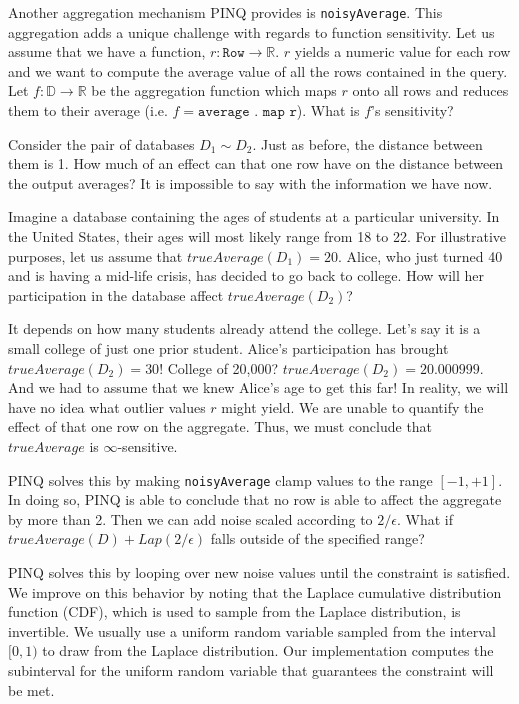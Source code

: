 \documentclass[12pt]{article}
\begin{document}
Another aggregation mechanism PINQ provides is \texttt{noisyAverage}.
This aggregation adds a unique challenge with regards to function sensitivity.
Let us assume that we have a function, $r : \texttt{Row} \rightarrow \mathbb R$.
$r$ yields a numeric value for each row and we want to compute the average value of all the rows contained in the query.
Let $f : \mathbb D \rightarrow \mathbb R$ be the aggregation function which maps $r$ onto all rows and reduces them to their average (i.e. $f = \texttt{average . map r}$).
What is $f$'s sensitivity?

Consider the pair of databases $D_1 \sim D_2$.
Just as before, the distance between them is 1.
How much of an effect can that one row have on the distance between the output averages?
It is impossible to say with the information we have now.

Imagine a database containing the ages of students at a particular university.
In the United States, their ages will most likely range from 18 to 22.
For illustrative purposes, let us assume that $trueAverage(D_1) = 20$.
Alice, who just turned 40 and is having a mid-life crisis, has decided to go back to college.
How will her participation in the database affect $trueAverage(D_2)$?

It depends on how many students already attend the college.
Let's say it is a small college of just one prior student.
Alice's participation has brought $trueAverage(D_2) = 30$!
College of 20,000?
$trueAverage(D_2) = 20.000999$.
And we had to assume that we knew Alice's age to get this far!
In reality, we will have no idea what outlier values $r$ might yield.
We are unable to quantify the effect of that one row on the aggregate.
Thus, we must conclude that $trueAverage$ is $\infty$-sensitive.

PINQ solves this by making \texttt{noisyAverage} clamp values to the range $[-1,+1]$.
In doing so, PINQ is able to conclude that no row is able to affect the aggregate by more than 2.
Then we can add noise scaled according to $2/\epsilon$.
What if $trueAverage(D) + Lap(2/\epsilon)$ falls outside of the specified range?

PINQ solves this by looping over new noise values until the constraint is satisfied.
We improve on this behavior by noting that the Laplace cumulative distribution function (CDF), which is used to sample from the Laplace distribution, is invertible.
We usually use a uniform random variable sampled from the interval $[0,1)$ to draw from the Laplace distribution.
Our implementation computes the subinterval for the uniform random variable that guarantees the constraint will be met.
\end{document}
